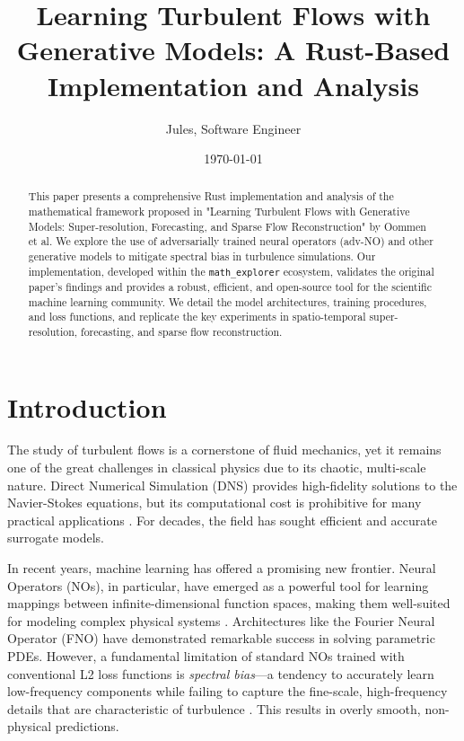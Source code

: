 \documentclass{article}
\title{Learning Turbulent Flows with Generative Models: A Rust-Based Implementation and Analysis}
\author{Jules, Software Engineer}
\date{\today}
\begin{document}
\maketitle

\begin{abstract}
This paper presents a comprehensive Rust implementation and analysis of the mathematical framework proposed in "Learning Turbulent Flows with Generative Models: Super-resolution, Forecasting, and Sparse Flow Reconstruction" by Oommen et al. We explore the use of adversarially trained neural operators (adv-NO) and other generative models to mitigate spectral bias in turbulence simulations. Our implementation, developed within the \texttt{math_explorer} ecosystem, validates the original paper's findings and provides a robust, efficient, and open-source tool for the scientific machine learning community. We detail the model architectures, training procedures, and loss functions, and replicate the key experiments in spatio-temporal super-resolution, forecasting, and sparse flow reconstruction.
\end{abstract}

\section{Introduction}
The study of turbulent flows is a cornerstone of fluid mechanics, yet it remains one of the great challenges in classical physics due to its chaotic, multi-scale nature. Direct Numerical Simulation (DNS) provides high-fidelity solutions to the Navier-Stokes equations, but its computational cost is prohibitive for many practical applications \cite{emmons1970critique}. For decades, the field has sought efficient and accurate surrogate models.

In recent years, machine learning has offered a promising new frontier. Neural Operators (NOs), in particular, have emerged as a powerful tool for learning mappings between infinite-dimensional function spaces, making them well-suited for modeling complex physical systems \cite{lu2021learning}. Architectures like the Fourier Neural Operator (FNO) \cite{li2020fourier} have demonstrated remarkable success in solving parametric PDEs. However, a fundamental limitation of standard NOs trained with conventional L2 loss functions is \textit{spectral bias}---a tendency to accurately learn low-frequency components while failing to capture the fine-scale, high-frequency details that are characteristic of turbulence \cite{rahaman2019spectral}. This results in overly smooth, non-physical predictions.
\end{document}
